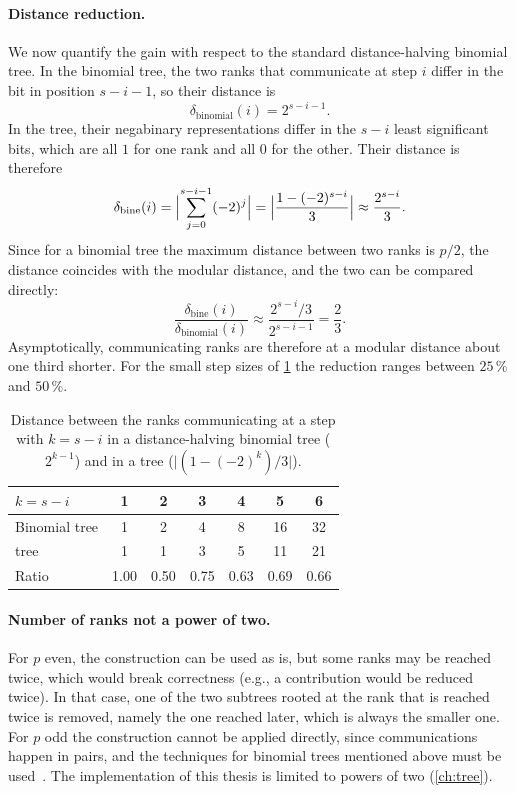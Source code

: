 \paragraph{Distance reduction.}
We now quantify the gain with respect to the standard distance-halving binomial tree.
In the binomial tree, the two ranks that communicate at step $i$ differ in the bit in position $s-i-1$, so their distance is
\begin{equation}
  \delta_{\text{binomial}}(i)=2^{s-i-1}.
\end{equation}
In the \bine{} tree, their negabinary representations differ in the $s-i$ least significant bits, which are all $1$ for one rank and all $0$ for the other.
Their distance is therefore
\begin{equation}
  \delta_{\text{bine}}(i)=\Bigl|\sum_{j=0}^{s-i-1}(-2)^j\Bigr|
  =\Bigl|\frac{1-(-2)^{s-i}}{3}\Bigr|\approx\frac{2^{s-i}}{3}.
\end{equation}
Since for a binomial tree the maximum distance between two ranks is $p/2$, the distance coincides with the modular distance, and the two can be compared directly:
\begin{equation}
  \frac{\delta_{\text{bine}}(i)}{\delta_{\text{binomial}}(i)}
  \approx\frac{2^{s-i}/3}{2^{s-i-1}}=\frac{2}{3}.
  \label{eq:bg-distance-ratio}
\end{equation}
Asymptotically, communicating ranks are therefore at a modular distance about one third shorter. For the small step sizes of \cref{tab:bg-distance} the reduction ranges between $25\,\%$ and $50\,\%$.

\begin{table}[t]
\centering
\small
\caption{Distance between the ranks communicating at a step with $k=s-i$ in a distance-halving binomial tree ($2^{k-1}$) and in a \bine{} tree ($\lvert(1-(-2)^k)/3\rvert$).}
\label{tab:bg-distance}
\begin{tabular}{@{}lcccccc@{}}
\toprule
$k=s-i$ & 1 & 2 & 3 & 4 & 5 & 6 \\
\midrule
Binomial tree & 1 & 2 & 4 & 8 & 16 & 32 \\
\bine{} tree & 1 & 1 & 3 & 5 & 11 & 21 \\
Ratio & 1.00 & 0.50 & 0.75 & 0.63 & 0.69 & 0.66 \\
\bottomrule
\end{tabular}
\end{table}

\paragraph{Number of ranks not a power of two.}
For $p$ even, the construction can be used as is, but some ranks may be reached twice, which would break correctness (e.g., a contribution would be reduced twice).
In that case, one of the two subtrees rooted at the rank that is reached twice is removed, namely the one reached later, which is always the smaller one.
For $p$ odd the construction cannot be applied directly, since communications happen in pairs, and the techniques for binomial trees mentioned above must be used~\cite{desensi2025bine}.
The implementation of this thesis is limited to powers of two (\cref{ch:tree}).

